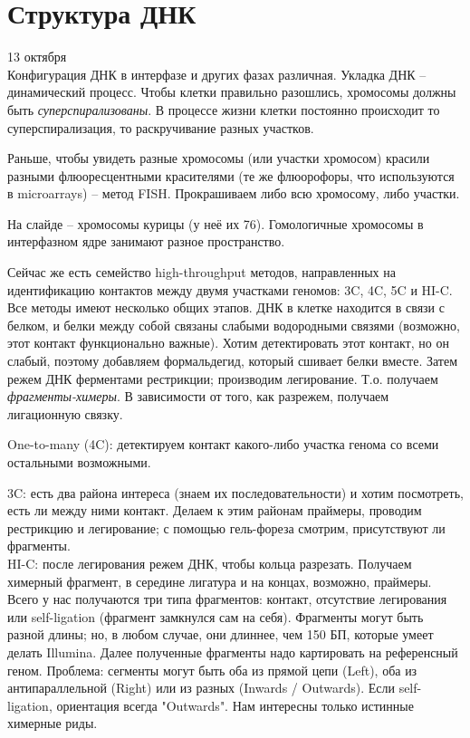 \documentclass[main.tex]{subfiles}
\begin{document}
	
\section{Структура ДНК}
13 октября \\

Конфигурация  ДНК в интерфазе и других фазах различная.
Укладка ДНК -- динамический процесс.
Чтобы клетки правильно разошлись, хромосомы должны быть \emph{суперспирализованы}.
В процессе жизни клетки постоянно происходит то суперспирализация, то раскручивание разных участков.

Раньше, чтобы увидеть разные хромосомы (или участки хромосом) красили разными флюоресцентными красителями (те же флюорофоры, что используются в microarrays) -- метод FISH.
Прокрашиваем либо всю хромосому, либо участки.

На слайде -- хромосомы курицы (у неё их 76).
Гомологичные хромосомы в интерфазном ядре занимают разное пространство.

Сейчас же есть семейство high-throughput методов, направленных на идентификацию контактов между двумя участками геномов: 3C, 4C, 5C и HI-C.
Все методы имеют несколько общих этапов.
ДНК в клетке находится в связи с белком, и белки между собой связаны слабыми водородными связями (возможно, этот контакт функционально важные).
Хотим детектировать этот контакт, но он слабый, поэтому добавляем формальдегид, который сшивает белки вместе.
Затем режем ДНК ферментами рестрикции; производим легирование.
Т.о. получаем \emph{фрагменты-химеры}.
В зависимости от того, как разрежем, получаем лигационную связку.

One-to-many (4C): детектируем контакт какого-либо участка генома со всеми остальными возможными.

 3C: есть два района интереса (знаем их последовательности) и хотим посмотреть, есть ли между ними контакт.
 Делаем к этим районам праймеры, проводим рестрикцию и легирование; с помощью гель-фореза смотрим, присутствуют ли фрагменты. \\
 
 HI-C: после легирования режем ДНК, чтобы кольца разрезать. %
 Получаем химерный фрагмент, в середине лигатура и на концах, возможно, праймеры.
 Всего у нас получаются три типа фрагментов: контакт, отсутствие легирования или self-ligation (фрагмент замкнулся сам на себя).
 Фрагменты могут быть разной длины; но, в любом случае, они длиннее, чем 150 БП, которые умеет делать Illumina.
 Далее полученные фрагменты надо картировать на референсный геном.
 Проблема: сегменты могут быть оба из прямой цепи (Left), оба из антипараллельной (Right) или из разных (Inwards / Outwards).
 Если self-ligation, ориентация всегда "Outwards".
 Нам интересны только истинные химерные риды.
 
\end{document}
